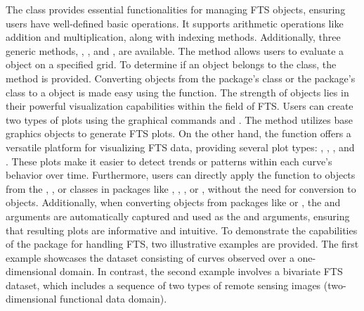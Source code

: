The  class provides essential functionalities for managing FTS objects, ensuring users have well-defined basic operations. It supports arithmetic operations like addition and multiplication, along with indexing methods. Additionally, three generic methods, , , and , are available. The  method allows users to evaluate a  object on a specified grid. To determine if an object belongs to the  class, the  method is provided. Converting objects from the  package's  class or the  package's  class to a  object is made easy using the  function. The strength of  objects lies in their powerful visualization capabilities within the field of FTS. Users can create two types of plots using the graphical commands  and . The  method utilizes base graphics objects to generate FTS plots. On the other hand, the  function offers a versatile  platform for visualizing FTS data, providing several plot types: , , , and . These plots make it easier to detect trends or patterns within each curve's behavior over time. Furthermore, users can directly apply the  function to objects from the , , or  classes in packages like , , , or , without the need for conversion to  objects. Additionally, when converting objects from packages like  or , the  and  arguments are automatically captured and used as the  and  arguments, ensuring that resulting plots are informative and intuitive.
To demonstrate the capabilities of the  package for handling FTS, two 
illustrative examples are provided. The first example showcases the  
dataset consisting of curves observed over a one-dimensional domain. In contrast, 
the second example involves a bivariate FTS dataset, which includes a sequence of 
two types of remote sensing images (two-dimensional functional data domain).
